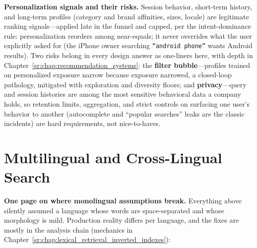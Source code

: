 \textbf{Personalization signals and their risks.} Session behavior, short-term history, and long-term profiles (category and brand affinities, sizes, locale) are legitimate ranking signals---applied late in the funnel and capped, per the intent-dominance rule: personalization reorders among near-equals; it never overrides what the user explicitly asked for (the iPhone owner searching \texttt{``android phone''} wants Android results). Two risks belong in every design answer as one-liners here, with depth in Chapter~\ref{sr:chap:recommendation_systems}: the \textbf{filter bubble}---profiles trained on personalized exposure narrow because exposure narrowed, a closed-loop pathology, mitigated with exploration and diversity floors; and \textbf{privacy}---query and session histories are among the most sensitive behavioral data a company holds, so retention limits, aggregation, and strict controls on surfacing one user's behavior to another (autocomplete and ``popular searches'' leaks are the classic incidents) are hard requirements, not nice-to-haves.

\section{Multilingual and Cross-Lingual Search}
\label{sr:sec:multilingual_search}

\textbf{One page on where monolingual assumptions break.} Everything above silently assumed a language whose words are space-separated and whose morphology is mild. Production reality differs per language, and the fixes are mostly in the analysis chain (mechanics in Chapter~\ref{sr:chap:lexical_retrieval_inverted_indexes}):

